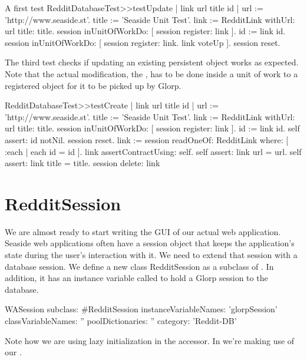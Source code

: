 \documentclass[a4paper,10pt,twoside]{book}
\begin{document}
\begin{code}{A first test}
RedditDatabaseTest>>testUpdate
    | link url title id |
    url := 'http://www.seaside.st'. 
    title := 'Seaside Unit Test'. 
    link := RedditLink withUrl: url title: title.
    session inUnitOfWorkDo: [ session register: link ]. 
         id := link id. 
     session inUnitOfWorkDo: [ session register: link. link voteUp ].      
     session reset.
\end{code}

 The third test checks if updating an existing persistent object works as expected. Note that the actual modification, the , has to be done inside a unit of work to a registered object for it to be picked up by Glorp.

\begin{code}{}
RedditDatabaseTest>>testCreate
     | link url title id |
     url := 'http://www.seaside.st'.
     title := 'Seaside Unit Test'.
     link := RedditLink withUrl: url title: title.
     session inUnitOfWorkDo: [ session register: link ].
     id := link id.
     self assert: id notNil. 
     session reset.
     link := session readOneOf: RedditLink where: [ :each | each id = id ]. 
     link assertContractUsing: self.
     self assert: link url = url.
     self assert: link title = title. 
     session delete: link
\end{code}


\section{RedditSession}
We are almost ready to start writing the GUI of our actual web application. Seaside web applications often have a session object that keeps the application's state during the user's interaction with it. We need to extend that session with a database session. We define a new class  RedditSession as a subclass of . In addition, it has an instance variable called  to hold a Glorp session to the database.

\begin{code}{}
WASession subclass: #RedditSession
   instanceVariableNames: 'glorpSession' 
   classVariableNames: '' 
   poolDictionaries: '' 
   category: 'Reddit-DB'
\end{code}

Note how we are using lazy initialization in the  accessor. In  we're making use of our . 
\end{document}

